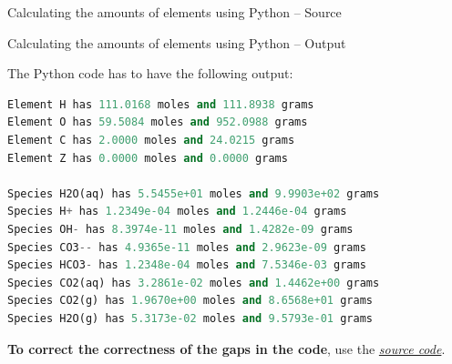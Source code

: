 %
%
\begin{frame}{Calculating the amounts of elements using Python -- Source}

	

\end{frame}
%
%
\begin{frame}[fragile]{Calculating the amounts of elements using Python -- Output}

The Python code has to have the following output:

\begin{lstlisting}[language=Python, caption=Calculating the amounts of elements using Python -- Output]
Element H has 111.0168 moles and 111.8938 grams
Element O has 59.5084 moles and 952.0988 grams
Element C has 2.0000 moles and 24.0215 grams
Element Z has 0.0000 moles and 0.0000 grams

Species H2O(aq) has 5.5455e+01 moles and 9.9903e+02 grams
Species H+ has 1.2349e-04 moles and 1.2446e-04 grams
Species OH- has 8.3974e-11 moles and 1.4282e-09 grams
Species CO3-- has 4.9365e-11 moles and 2.9623e-09 grams
Species HCO3- has 1.2348e-04 moles and 7.5346e-03 grams
Species CO2(aq) has 3.2861e-02 moles and 1.4462e+00 grams
Species CO2(g) has 1.9670e+00 moles and 8.6568e+01 grams
Species H2O(g) has 5.3173e-02 moles and 9.5793e-01 grams
\end{lstlisting}

\textbf{To correct the correctness of the gaps in the code}, use the  \href{https://polybox.ethz.ch/index.php/s/sVotdOJMkp740Lw}{\textcolor{indigo(dye)}{\it source code}}.

\end{frame}
%
